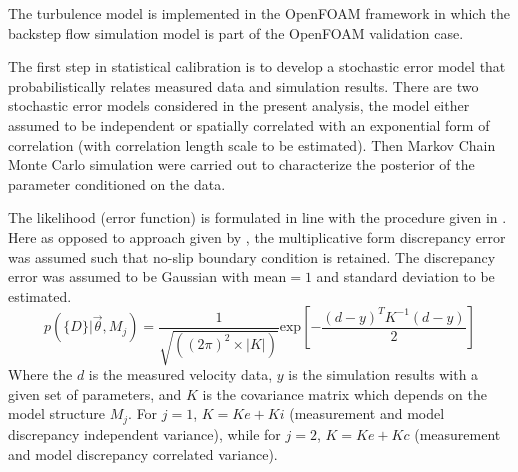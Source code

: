 \documentclass[11pt,titlepage]{article}
\begin{document}
The turbulence model is implemented in the OpenFOAM framework in which the backstep flow simulation model is part of the OpenFOAM validation case.

The first step in statistical calibration is to develop a stochastic error model that probabilistically relates measured data and simulation results. 
There are two stochastic error models considered in the present analysis, the model either assumed to be independent or spatially correlated with an exponential form of correlation (with correlation length scale to be estimated). 
Then Markov Chain Monte Carlo simulation were carried out to characterize the posterior of the parameter conditioned on the data.

The likelihood (error function) is formulated in line with the procedure given in \cite{Cheung2011}. 
Here as opposed to approach given by \cite{KennedyOHagan2001}, the multiplicative form discrepancy error was assumed such that no-slip boundary condition is retained. 
The discrepancy error was assumed to be Gaussian with mean$=1$ and standard deviation to be estimated.
\begin{equation}
p(\{D\} | \vec{\theta}, M_j) = \frac{1}{\sqrt{((2\pi)^2 \times|K|)}} \text{exp} \left[ - \frac{(d-y)^T K^{-1} (d-y)}{2} \right]
\end{equation}
Where the $d$ is the measured velocity data, $y$ is the simulation results with a given set of parameters, and $K$ is the covariance matrix which depends on the model structure $M_j$. 
For $j=1$, $K = Ke + Ki$ (measurement and model discrepancy independent variance), while for $j=2$, $K = Ke + Kc$ (measurement and model discrepancy correlated variance).
\end{document}
